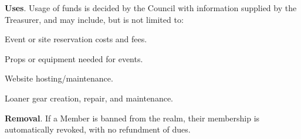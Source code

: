 \documentclass[12pt]{article}
\begin{document}
\begin{level}
\begin{level}
    \end{level}
    \item \textbf{Uses}. Usage of funds is decided by the Council with information supplied by the Treasurer, and may include, but is not limited to:
    \begin{level}
        \item Event or site reservation costs and fees.
        \item Props or equipment needed for events.
        \item Website hosting/maintenance.
        \item Loaner gear creation, repair, and maintenance.
    \end{level}
    \item \textbf{Removal}. If a Member is banned from the realm, their membership is automatically revoked, with no refundment of dues.
\end{level}
\end{document}
